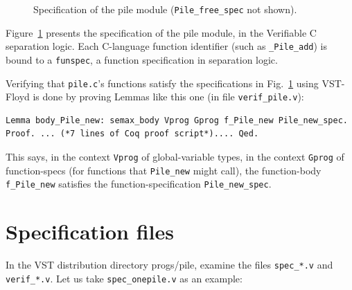 \documentclass[runningheads,orivec]{llncs}
\begin{document}
\begin{figure}[tp]
\begin{minipage}[t]{1.7in}
\end{minipage}
\vspace{-4ex}
\caption{\label{spec-pile} Specification of the pile module (\lstinline{Pile_free_spec} not shown).}

\end{figure}


Figure~\ref{spec-pile} presents the specification of the
pile module, in the Verifiable C separation logic.
Each C-language function identifier (such as \lstinline{_Pile_add})
is bound to a \lstinline{funspec}, a function specification
in separation logic.

Verifying that \lstinline{pile.c}'s functions satisfy the
specifications in Fig.~\ref{spec-pile} using VST-Floyd
is done by proving
Lemmas like this one (in file \lstinline{verif_pile.v}):

\begin{lstlisting}[language=coq]
Lemma body_Pile_new: semax_body Vprog Gprog f_Pile_new Pile_new_spec.
Proof. ... (*7 lines of Coq proof script*).... Qed.
\end{lstlisting}
\label{body-pile-new}
This says, in the context \lstinline{Vprog} of global-variable types,
in the context \lstinline{Gprog} of function-specs (for functions
that \lstinline{Pile_new} might call), the function-body
\lstinline{f_Pile_new} satisfies the function-specification
\lstinline{Pile_new_spec}.

\section{Specification files}
In the VST distribution directory progs/pile,
examine the files \lstinline{spec_*.v} and
\lstinline{verif_*.v}.  Let us take \lstinline{spec_onepile.v}
as an example:
\end{document}
